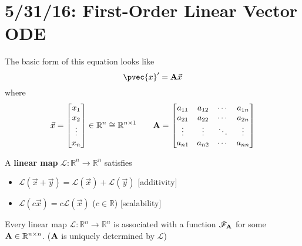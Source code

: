 \documentclass[12pt]{article}
\begin{document}
\section{5/31/16: First-Order Linear Vector ODE}

The basic form of this equation looks like \[ \pvec{x}' = {\bf A}\vec{x} \]
where
\[ \vec{x} = \begin{bmatrix}
x_1 \\ x_2 \\ \vdots \\ x_n
\end{bmatrix} \in \mathbb{R}^n \cong \mathbb{R}^{n \times 1} \qquad 
{\bf A} = \begin{bmatrix}
a_{11} & a_{12} & \cdots & a_{1n} \\
a_{21} & a_{22} & \cdots & a_{2n} \\
\vdots & \vdots & \ddots & \vdots \\
a_{n1} & a_{n2} & \cdots & a_{nn}
\end{bmatrix} \]

\begin{definition}
A \textbf{linear map} $\mathscr{L}: \mathbb{R}^n \to \mathbb{R}^n$ satisfies 
\begin{itemize}
\item $\mathscr{L}(\vec{x} + \vec{y}) = \mathscr{L}(\vec{x}) + \mathscr{L}(\vec{y})$ [additivity]
\item $\mathscr{L}(c\vec{x}) = c\mathscr{L}(\vec{x})$ ($c \in \mathbb{R}$) [scalability]
\end{itemize}
\end{definition}

\begin{theorem}
Every linear map $\mathscr{L}: \mathbb{R}^n \to \mathbb{R}^n$ is associated with a function $\mathscr{F}_{\bf A}$ for some ${\bf A} \in \mathbb{R}^{n \times n}$. (${\bf A}$ is uniquely determined by $\mathscr{L}$)
\end{theorem}
\end{document}
